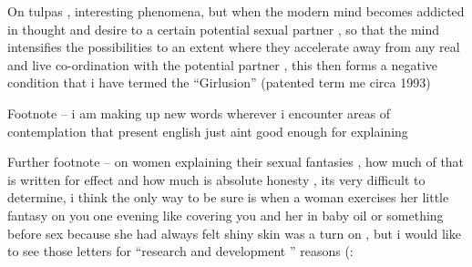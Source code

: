 \begin{footnotesize}
\begin{sffamily}
On tulpas , interesting phenomena, but when the modern mind becomes addicted in thought and desire to a certain potential sexual partner , so that the mind intensifies the possibilities to an extent where they accelerate away from any real and live co-ordination with the potential partner , this then forms a negative condition that i have termed the ``Girlusion'' (patented term me circa 1993)

Footnote -- i am making up new words wherever i encounter areas of contemplation that present english just aint good enough for explaining

Further footnote -- on women explaining their sexual fantasies , how much of that is written for effect and how much is absolute honesty , its very difficult to determine, i think the only way to be sure is when a woman exercises her little fantasy on you one evening like covering you and her in baby oil or something before sex because she had always felt shiny skin was a turn on , but i would like to see those letters for ``research and development '' reasons (:


\hfill

\end{sffamily}
\end{footnotesize}

